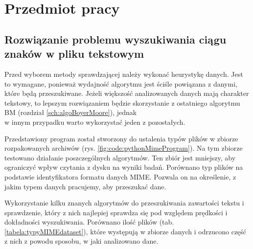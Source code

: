\chapter{Przedmiot pracy}



\section{Rozwiązanie problemu wyszukiwania ciągu znaków w pliku tekstowym}

Przed wyborem metody sprawdzającej należy wykonać heurystykę danych. Jest to 
wymagane, ponieważ wydajność algorytmu jest ściśle powiązana z danymi, które
będą przeszukiwane. Jeżeli większość analizowanych danych mają charakter
tekstowy, to lepszym rozwiązaniem będzie skorzystanie z ostatniego algorytmu BM
(rozdział \ref{sch:algoBoyerMoore}), jednak \\ w innym przypadku warto wykorzystać jeden z 
pozostałych.

Przedstawiony program został stworzony do ustalenia typów plików w zbiorze 
rozpakowanych archiwów (rys. \ref{fig:code:pythonMimeProgram}). Na tym zbiorze testowano działanie poszczególnych algorytmów.
Ten zbiór jest mniejszy, aby ograniczyć wpływ czytania z dysku na wyniki badań. 
Porównano typ plików na podstawie identyfikatora formatu danych MIME. Pozwala
on na określenie, z jakim typem danych pracujemy, aby przeszukać dane.

Wykorzystanie kilku znanych algorytmów do przeszukiwania zawartości
tekstu i sprawdzenie, który z nich najlepiej sprawdza się pod względem prędkości
i dokładności wyszukiwania. Porównano ilość plików (tab. \ref{tabela:typyMIMEdataset}),
które występują w zbiorze danych i odrzucono część z nich z powodu sposobu, w jaki
analizowano dane.


